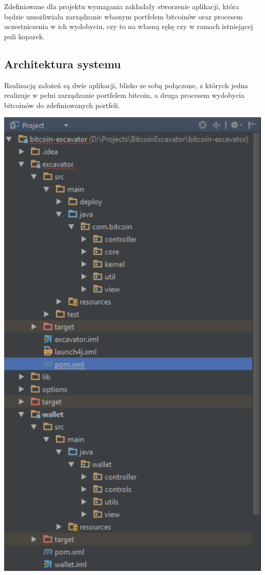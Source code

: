 \documentclass[11pt,a4paper]{article}
\begin{document}
Zdefiniowane dla projektu wymagania zakładały stworzenie aplikacji, która będzie umożliwiała zarządzanie własnym portfelem bitcoinów oraz procesem uczestniczenia w ich wydobyciu, czy to na własną rękę czy w ramach istniejącej puli koparek.

\subsection{Architektura systemu}

Realizacją założeń są dwie aplikacji, blisko ze sobą połączone, z których jedna realizuje w pełni zarządzanie portfelem bitcoin, a druga procesem wydobycia bitcoinów do zdefiniowanych portfeli.

\includegraphics{images/project_structure.PNG}
\end{document}

